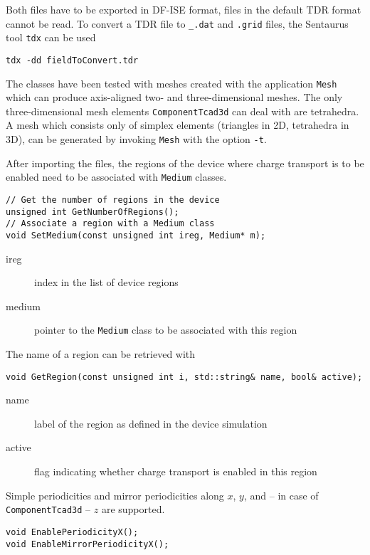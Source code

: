 Both files have to be exported in DF-ISE format, 
files in the default TDR format cannot be read.
To convert a TDR file to \texttt{\_.dat} and \texttt{.grid} files, the
Sentaurus tool \texttt{tdx} can be used
\begin{lstlisting}
tdx -dd fieldToConvert.tdr
\end{lstlisting}

The classes have been tested with meshes created with the application 
\texttt{Mesh} which can produce axis-aligned 
two- and three-dimensional meshes.
The only three-dimensional mesh elements \texttt{ComponentTcad3d} 
can deal with are tetrahedra. 
A mesh which consists only of simplex elements 
(triangles in 2D, tetrahedra in 3D), 
can be generated by invoking \texttt{Mesh} with the option \texttt{-t}.

After importing the files, 
the regions of the device where charge transport is to be enabled 
need to be associated with \texttt{Medium} classes. 
\begin{lstlisting}
// Get the number of regions in the device
unsigned int GetNumberOfRegions();
// Associate a region with a Medium class
void SetMedium(const unsigned int ireg, Medium* m);
\end{lstlisting}
\begin{description}
  \item[ireg]
  index in the list of device regions
  \item[medium]
  pointer to the \texttt{Medium} class to be associated with this region
\end{description}

The name of a region can be retrieved with
\begin{lstlisting}
void GetRegion(const unsigned int i, std::string& name, bool& active);
\end{lstlisting}
\begin{description}
  \item[name] 
  label of the region as defined in the device simulation
  \item[active] 
  flag indicating whether charge transport is enabled 
  in this region
\end{description}

Simple periodicities and mirror periodicities along 
\(x\), \(y\), and -- in case of \texttt{ComponentTcad3d} -- \(z\) 
are supported. 
\begin{lstlisting}
void EnablePeriodicityX();
void EnableMirrorPeriodicityX();
\end{lstlisting}

